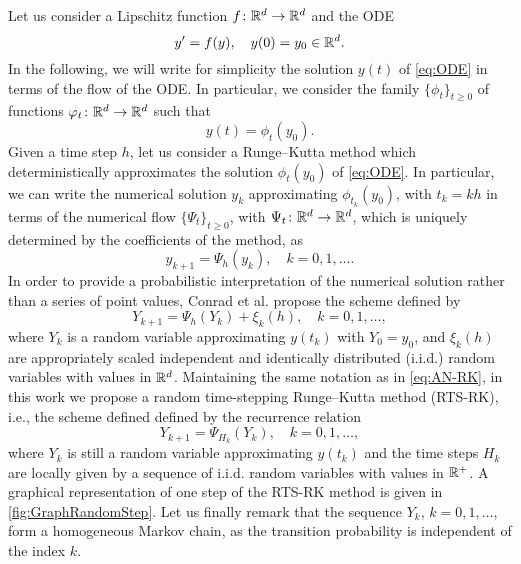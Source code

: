 \documentclass[10pt]{article}
\begin{document}
Let us consider a Lipschitz function $f\colon\mathbb{R}^d\to\mathbb{R}^d$ and the ODE
\begin{equation}\label{eq:ODE}
	y' = f(y), \quad y(0) = y_0 \in \mathbb{R}^d.
\end{equation}
In the following, we will write for simplicity the solution $y(t)$ of \eqref{eq:ODE} in terms of the flow of the ODE. In particular, we consider the family  $\{\phi_t\}_{t \geq 0}$ of functions $\varphi_t\colon\mathbb{R}^d\to\mathbb{R}^d$ such that 
\begin{equation}
	y(t) = \phi_t(y_0).
\end{equation}
Given a time step $h$, let us consider a Runge--Kutta method which deterministically approximates the solution $\phi_t(y_0)$ of \eqref{eq:ODE}. In particular, we can write the numerical solution $y_k$ approximating $\phi_{t_k}(y_0)$, with $t_k = kh$ in terms of the numerical flow $\{\Psi_t\}_{t \geq 0}$, with $\Psi_t\colon\mathbb{R}^d\to\mathbb{R}^d$, which is uniquely determined by the coefficients of the method, as
\begin{equation}
	y_{k+1} = \Psi_h(y_k), \quad k = 0, 1, \ldots.
\end{equation}
In order to provide a probabilistic interpretation of the numerical solution rather than a series of point values, Conrad et al. propose the scheme defined by
\begin{equation}\label{eq:AN-RK}
	Y_{k+1} = \Psi_h(Y_{k}) + \xi_k(h), \quad k = 0, 1, \ldots,
\end{equation}
where $Y_k$ is a random variable approximating $y(t_k)$ with $Y_0 = y_0$, and $\xi_k(h)$ are appropriately scaled independent and identically distributed (i.i.d.) random variables with values in $\mathbb{R}^d$. Maintaining the same notation as in \eqref{eq:AN-RK}, in this work we propose a random time-stepping Runge--Kutta method (RTS-RK), i.e., the scheme defined defined by the recurrence relation
\begin{equation}\label{eq:RTS-RK}
	Y_{k+1} = \Psi_{H_k}(Y_k), \quad k = 0, 1, \ldots,
\end{equation}
where $Y_k$ is still a random variable approximating $y(t_k)$ and the time steps $H_k$ are locally given by a sequence  of i.i.d. random variables with values in $\mathbb{R}^+$. A graphical representation of one step of the RTS-RK method is given in \cref{fig:GraphRandomStep}. Let us finally remark that the sequence $Y_k$, $k = 0, 1, \ldots$, form a homogeneous Markov chain, as the transition probability is independent of the index $k$.
\end{document}
